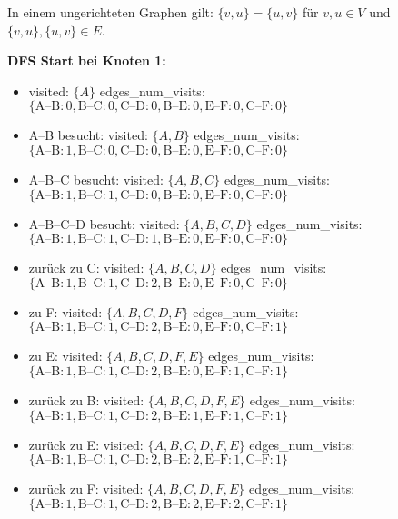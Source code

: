 In einem ungerichteten Graphen gilt: $\{v,u\} = \{u,v\}$ für $v, u \in V$ und $\{v,u\}, \{u,v\} \in E$.

\vspace{1em}
\noindent\textbf{DFS Start bei Knoten 1:}

\begin{itemize}
	\item visited: $\{A\}$  
	edges\_num\_visits: $\{\text{A--B}: 0, \text{B--C}: 0, \text{C--D}: 0, \text{B--E}: 0, \text{E--F}: 0, \text{C--F}: 0\}$
	
	\item A--B besucht: visited: $\{A, B\}$  
	edges\_num\_visits: $\{\text{A--B}: 1, \text{B--C}: 0, \text{C--D}: 0, \text{B--E}: 0, \text{E--F}: 0, \text{C--F}: 0\}$
	
	\item A--B--C besucht: visited: $\{A, B, C\}$  
	edges\_num\_visits: $\{\text{A--B}: 1, \text{B--C}: 1, \text{C--D}: 0, \text{B--E}: 0, \text{E--F}: 0, \text{C--F}: 0\}$
	
	\item A--B--C--D besucht: visited: $\{A, B, C, D\}$  
	edges\_num\_visits: $\{\text{A--B}: 1, \text{B--C}: 1, \text{C--D}: 1, \text{B--E}: 0, \text{E--F}: 0, \text{C--F}: 0\}$
	
	\item zurück zu C: visited: $\{A, B, C, D\}$  
	edges\_num\_visits: $\{\text{A--B}: 1, \text{B--C}: 1, \text{C--D}: 2, \text{B--E}: 0, \text{E--F}: 0, \text{C--F}: 0\}$
	
	\item zu F: visited: $\{A, B, C, D, F\}$  
	edges\_num\_visits: $\{\text{A--B}: 1, \text{B--C}: 1, \text{C--D}: 2, \text{B--E}: 0, \text{E--F}: 0, \text{C--F}: 1\}$
	
	\item zu E: visited: $\{A, B, C, D, F, E\}$  
	edges\_num\_visits: $\{\text{A--B}: 1, \text{B--C}: 1, \text{C--D}: 2, \text{B--E}: 0, \text{E--F}: 1, \text{C--F}: 1\}$
	
	\item zurück zu B: visited: $\{A, B, C, D, F, E\}$  
	edges\_num\_visits: $\{\text{A--B}: 1, \text{B--C}: 1, \text{C--D}: 2, \text{B--E}: 1, \text{E--F}: 1, \text{C--F}: 1\}$
	
	\item zurück zu E: visited: $\{A, B, C, D, F, E\}$  
	edges\_num\_visits: $\{\text{A--B}: 1, \text{B--C}: 1, \text{C--D}: 2, \text{B--E}: 2, \text{E--F}: 1, \text{C--F}: 1\}$
	
	\item zurück zu F: visited: $\{A, B, C, D, F, E\}$  
	edges\_num\_visits: $\{\text{A--B}: 1, \text{B--C}: 1, \text{C--D}: 2, \text{B--E}: 2, \text{E--F}: 2, \text{C--F}: 1\}$
	

\end{itemize}
